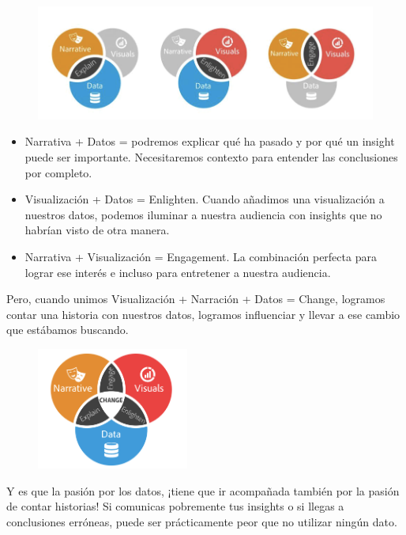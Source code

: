 \documentclass[preprint,12pt]{elsarticle}
\begin{document}
			\begin{figure}[htb]
				\begin{center}
					\includegraphics[width=13cm]{./Imagenes/img1}
				\end{center}
			\end{figure}
\begin{itemize}
		\item Narrativa + Datos = podremos explicar qué ha pasado y por qué un insight puede ser importante. Necesitaremos contexto para entender las 	conclusiones por completo.
		\item Visualización + Datos = Enlighten. Cuando añadimos una visualización a nuestros datos, podemos iluminar a nuestra audiencia con insights que no habrían visto de otra manera.
		\item Narrativa + Visualización = Engagement. La combinación perfecta para lograr ese interés e incluso para entretener a nuestra audiencia. 
	\end{itemize}

Pero, cuando unimos Visualización + Narración + Datos = Change, logramos contar una historia con nuestros datos, logramos influenciar y llevar a ese cambio que estábamos buscando.
\begin{figure}[htb]
				\begin{center}
					\includegraphics[width=5cm]{./Imagenes/img2}
				\end{center}
			\end{figure}
Y es que la pasión por los datos, ¡tiene que ir acompañada también por la pasión de contar historias! Si comunicas pobremente tus insights o si llegas a conclusiones erróneas, puede ser prácticamente peor que no utilizar ningún dato.
\end{document}
